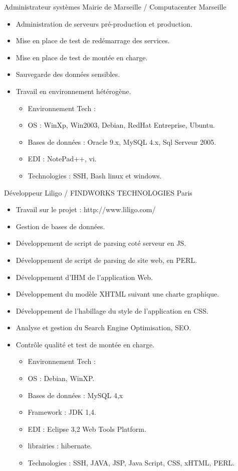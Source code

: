 \documentclass[10pt,a4paper,sans]{moderncv}
\begin{document}
 {Administrateur systèmes} {Mairie de Marseille / Computacenter}
{Marseille}{} {
    \begin{itemize}%
        \item Administration de serveurs pré-production et production.
        \item Mise en place de test de redémarrage des services.
        \item Mise en place de test de montée en charge.
        \item Sauvegarde des données sensibles.
        \item Travail en environnement hétérogène.
            \begin{itemize}%
                \item Environnement Tech :
                \item OS : WinXp, Win2003, Debian, RedHat Entreprise, Ubuntu.
                \item Bases de données : Oracle 9.x, MySQL 4.x, Sql Serveur 2005.
                \item EDI : NotePad++, vi.
                \item Technologies : SSH, Bash linux et windows.
            \end{itemize}
\end{itemize}}

 {Développeur} {Liligo / FINDWORKS TECHNOLOGIES}
{Paris}{} {
    \begin{itemize}%
        \item Travail sur le projet : http://www.liligo.com/
        \item Gestion de bases de données.
        \item Développement de script de parsing coté serveur en JS.
        \item Développement de script de parsing de site web, en PERL.
        \item Développement d'IHM de l'application Web.
        \item Développement du modèle XHTML suivant une charte graphique.
        \item Développement de l’habillage du style de l'application en CSS.
        \item Analyse et gestion du Search Engine Optimisation, SEO.
        \item Contrôle qualité et test de montée en charge.
            \begin{itemize}%
                \item Environnement Tech :
                \item OS : Debian, WinXP.
                \item Bases de données : MySQL 4,x
                \item Framework : JDK 1,4.
                \item EDI : Eclipse 3,2 Web Tools Platform.
                \item librairies : hibernate.
                \item Technologies : SSH, JAVA, JSP, Java Script, CSS, xHTML, PERL.
            \end{itemize}
\end{itemize}}
\end{document}
